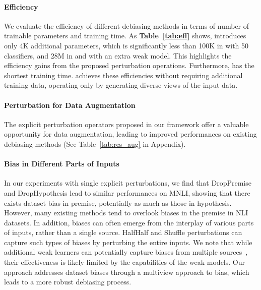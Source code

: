 \paragraph{Efficiency}
We evaluate the efficiency of different debiasing methods in terms of number of trainable parameters and training time. 
As \textbf{Table~\ref{tab:eff}} shows,  \OursCL introduces only 4K additional parameters, which is significantly less than 100K in \IE with 50 classifiers, and 28M in \MASK and \READ with an extra weak model. This highlights the efficiency gains from the proposed perturbation operations. Furthermore, \OursCL has the shortest training time. \OursCL achieves these efficiencies without requiring additional training data, operating only by generating diverse views of the input data.


\paragraph{Perturbation for Data Augmentation}
The explicit perturbation operators proposed in our framework offer a valuable opportunity for data augmentation, leading to improved performances on existing debiasing methods (See Table~\ref{tab:res_aug} in Appendix).


\paragraph{Bias in Different Parts of Inputs}
In our experiments with single explicit perturbations, we find that DropPremise and DropHypothesis lead to similar performances on MNLI, 
showing that there exists dataset bias in premise, potentially as much as those in hypothesis. However, many existing methods tend to overlook biases in the premise in NLI datasets.
%
In addition, biases can often emerge from the interplay of various parts of inputs, rather than a single source. HalfHalf and Shuffle perturbations can capture such types of biases by perturbing the entire inputs. We note that while additional weak learners can potentially capture biases from multiple sources~\citep{utama-etal-2020-towards,sanh2020learning,meissner-etal-2022-debiasing}, their effectiveness  is likely limited by the capabilities of the weak models. 
Our approach addresses dataset biases through a multiview approach to bias, which leads to a more robust debiasing process.






